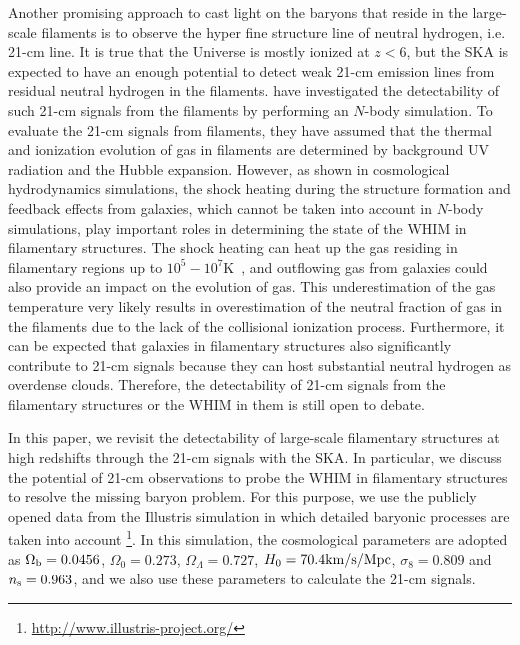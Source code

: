 \documentclass[a4paper,fleqn,usenatbib,useAMS]{mnras}
\begin{document}
Another promising approach to cast light on the baryons that reside in the large-scale filaments is to observe the hyper fine structure line of neutral hydrogen, i.e.  21-cm line. 
It is true that the Universe is mostly ionized at $z<6$, but the SKA is
expected to have an enough potential to detect weak  21-cm
emission lines from residual neutral hydrogen in the filaments. 
\citet{Takeuchi2014} have investigated the detectability of such 
21-cm signals from the filaments by performing an $N$-body simulation. 
To evaluate the 21-cm signals from filaments, they have assumed that the thermal and ionization evolution of gas in
filaments are determined by background UV radiation and the Hubble expansion.
However, as shown in cosmological hydrodynamics simulations, 
the shock heating during the structure formation and feedback effects from galaxies, which cannot be taken into account in $N$-body simulations, play important roles in determining the state of the WHIM in filamentary structures.
The shock heating can heat up the gas residing in filamentary regions up to $10^{5}-10^{7}$K~\citep{Dave2001,Bregman2007}, and outflowing gas from galaxies could also provide an impact on the evolution of gas. 
This underestimation of the gas temperature very likely results in
overestimation of the neutral fraction of gas in the filaments
due to the lack of the collisional ionization process. 
Furthermore, it can be expected that galaxies in filamentary structures also significantly contribute to 21-cm signals because they can host substantial neutral hydrogen as overdense clouds.
Therefore, the detectability of  21-cm signals from the filamentary structures or the WHIM in them is still open to debate. 

In this paper, we revisit the detectability of large-scale filamentary structures at high redshifts
through the  21-cm signals with the SKA. 
In particular, we discuss the potential of 21-cm observations to probe
the WHIM in filamentary structures to resolve the missing baryon problem.
For this purpose, we use the publicly opened data from the Illustris simulation in which detailed baryonic processes are taken into account \citep{Genel2014,Vogelsberger2014}\footnote{\url{http://www.illustris-project.org/}}. 
In this simulation, the cosmological parameters are adopted as
$\Omega_{\rm b}=0.0456$, $\Omega_0=0.273$, $\Omega_{\Lambda}=0.727$,
$H_{0}=70.4\rm{km/s/Mpc}$, $\sigma_8=0.809$ and $n_{\rm s}=0.963$, and we also
use these parameters to calculate the 21-cm signals.
\end{document}
